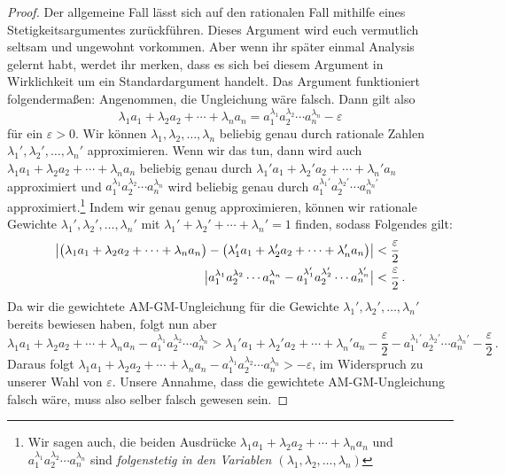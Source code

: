 \begin{proof}
	Der allgemeine Fall lässt sich auf den rationalen Fall mithilfe eines Stetigkeitsargumentes zurückführen. Dieses Argument wird euch vermutlich seltsam und ungewohnt vorkommen. Aber wenn ihr später einmal Analysis gelernt habt, werdet ihr merken, dass es sich bei diesem Argument in Wirklichkeit um ein Standardargument handelt. Das Argument funktioniert folgendermaßen: Angenommen, die Ungleichung wäre falsch. Dann gilt also
	\begin{equation*}
		\lambda_1 a_1+\lambda_2 a_2+\dotsb+\lambda_na_n=a_1^{\lambda_1}a_2^{\lambda_2}\dotsm a_n^{\lambda_n}-\varepsilon
	\end{equation*}
	für ein $\varepsilon>0$. Wir können $\lambda_1,\lambda_2,\dotsc,\lambda_n$ beliebig genau durch rationale Zahlen $\lambda_1',\lambda_2',\dotsc,\lambda_n'$ approximieren. Wenn wir das tun, dann wird auch $\lambda_1 a_1+\lambda_2 a_2+\dotsb+\lambda_na_n$ beliebig genau durch $\lambda_1' a_1+\lambda_2' a_2+\dotsb+\lambda_n'a_n$ approximiert und $a_1^{\lambda_1}a_2^{\lambda_2}\dotsm a_n^{\lambda_n}$  wird beliebig genau durch $a_1^{\lambda_1'}a_2^{\lambda_2'}\dotsm a_n^{\lambda_n'}$ approximiert.\footnote{Wir sagen auch, die beiden Ausdrücke $\lambda_1 a_1+\lambda_2 a_2+\dotsb+\lambda_na_n$ und $a_1^{\lambda_1}a_2^{\lambda_2}\dotsm a_n^{\lambda_n}$ sind \emph{folgenstetig in den Variablen $(\lambda_1,\lambda_2,\dotsc,\lambda_n)$}} Indem wir genau genug approximieren, können wir rationale Gewichte $\lambda_1',\lambda_2',\dotsc,\lambda_n'$ mit $\lambda_1'+\lambda_2'+\dotsb+\lambda_n'=1$ finden, sodass Folgendes gilt:
	\begin{align*}
		\abs[\big]{\parens[\big]{\lambda_1 a_1+\lambda_2 a_2+\dotsb+\lambda_na_n}-\parens[\big]{\lambda_1' a_1+\lambda_2' a_2+\dotsb+\lambda_n'a_n}}&<\frac{\varepsilon}{2}\\
		\abs[\big]{a_1^{\lambda_1}a_2^{\lambda_2}\dotsm a_n^{\lambda_n}-a_1^{\lambda_1'}a_2^{\lambda_2'}\dotsm a_n^{\lambda_n'}}&<\frac{\varepsilon}{2}\,.
	\end{align*}
	Da wir die gewichtete AM-GM-Ungleichung für die Gewichte $\lambda_1',\lambda_2',\dotsc,\lambda_n'$ bereits bewiesen haben, folgt nun aber
	\begin{equation*}
		\lambda_1 a_1+\lambda_2 a_2+\dotsb+\lambda_na_n-a_1^{\lambda_1}a_2^{\lambda_2}\dotsm a_n^{\lambda_n}>\lambda_1' a_1+\lambda_2' a_2+\dotsb+\lambda_n'a_n-\frac{\varepsilon}{2}-a_1^{\lambda_1'}a_2^{\lambda_2'}\dotsm a_n^{\lambda_n'}-\frac{\varepsilon}{2}\,.
	\end{equation*}
	Daraus folgt $\lambda_1 a_1+\lambda_2 a_2+\dotsb+\lambda_na_n-a_1^{\lambda_1}a_2^{\lambda_2}\dotsm a_n^{\lambda_n}>-\varepsilon$, im Widerspruch zu unserer Wahl von $\varepsilon$. Unsere Annahme, dass die gewichtete AM-GM-Ungleichung falsch wäre, muss also selber falsch gewesen sein.
	

\end{proof}
